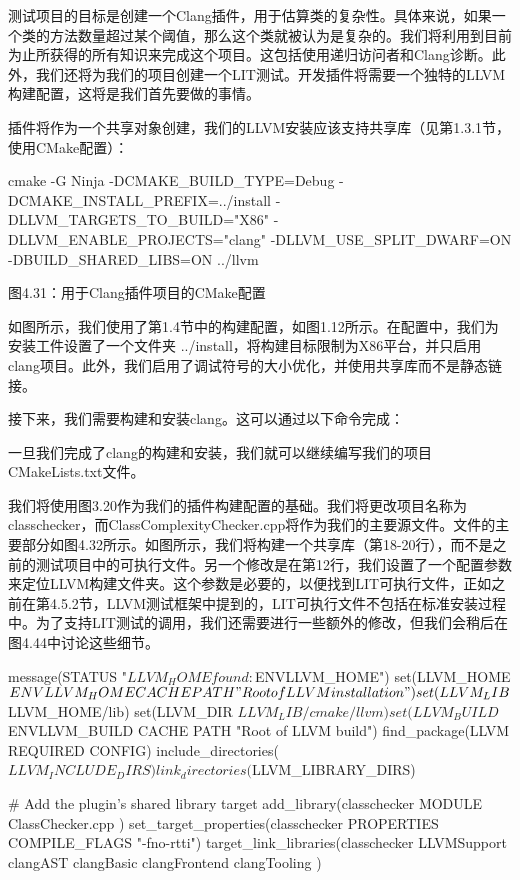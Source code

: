 测试项目的目标是创建一个Clang插件，用于估算类的复杂性。具体来说，如果一个类的方法数量超过某个阈值，那么这个类就被认为是复杂的。我们将利用到目前为止所获得的所有知识来完成这个项目。这包括使用递归访问者和Clang诊断。此外，我们还将为我们的项目创建一个LIT测试。开发插件将需要一个独特的LLVM构建配置，这将是我们首先要做的事情。



插件将作为一个共享对象创建，我们的LLVM安装应该支持共享库（见第1.3.1节，使用CMake配置）：

\begin{shell}
cmake -G Ninja -DCMAKE_BUILD_TYPE=Debug -DCMAKE_INSTALL_PREFIX=../install -DLLVM_TARGETS_TO_BUILD="X86" -DLLVM_ENABLE_PROJECTS="clang" -DLLVM_USE_SPLIT_DWARF=ON -DBUILD_SHARED_LIBS=ON ../llvm
\end{shell}

\begin{center}
图4.31：用于Clang插件项目的CMake配置
\end{center}

如图所示，我们使用了第1.4节中的构建配置，如图1.12所示。在配置中，我们为安装工件设置了一个文件夹 ../install，将构建目标限制为X86平台，并只启用clang项目。此外，我们启用了调试符号的大小优化，并使用共享库而不是静态链接。

接下来，我们需要构建和安装clang。这可以通过以下命令完成：


一旦我们完成了clang的构建和安装，我们就可以继续编写我们的项目CMakeLists.txt文件。


我们将使用图3.20作为我们的插件构建配置的基础。我们将更改项目名称为classchecker，而ClassComplexityChecker.cpp将作为我们的主要源文件。文件的主要部分如图4.32所示。如图所示，我们将构建一个共享库（第18-20行），而不是之前的测试项目中的可执行文件。另一个修改是在第12行，我们设置了一个配置参数来定位LLVM构建文件夹。这个参数是必要的，以便找到LIT可执行文件，正如之前在第4.5.2节，LLVM测试框架中提到的，LIT可执行文件不包括在标准安装过程中。为了支持LIT测试的调用，我们还需要进行一些额外的修改，但我们会稍后在图4.44中讨论这些细节。



\begin{cmake}
message(STATUS "$LLVM_HOME found: $ENV{LLVM_HOME}")
set(LLVM_HOME $ENV{LLVM_HOME} CACHE PATH "Root of LLVM installation")
set(LLVM_LIB ${LLVM_HOME}/lib)
set(LLVM_DIR ${LLVM_LIB}/cmake/llvm)
set(LLVM_BUILD $ENV{LLVM_BUILD} CACHE PATH "Root of LLVM build")
find_package(LLVM REQUIRED CONFIG)
include_directories(${LLVM_INCLUDE_DIRS})
link_directories(${LLVM_LIBRARY_DIRS})

# Add the plugin's shared library target
add_library(classchecker MODULE
  ClassChecker.cpp
)
set_target_properties(classchecker PROPERTIES COMPILE_FLAGS "-fno-rtti")
target_link_libraries(classchecker
  LLVMSupport
  clangAST
  clangBasic
  clangFrontend
  clangTooling
)
\end{cmake}

